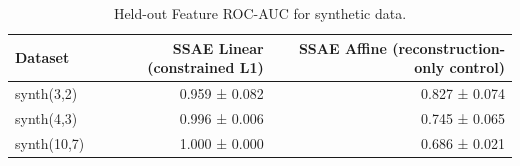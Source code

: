 \begin{table}[t]
\centering
\caption{Held-out Feature ROC-AUC for synthetic data.}
\label{tab:synthetic-sae-auc}
\begin{tabular}{lrr}
\toprule
Dataset & SSAE Linear (constrained L1) & SSAE Affine (reconstruction-only control) \\
\midrule
synth(3,2) & 0.959 ± 0.082 & 0.827 ± 0.074 \\
synth(4,3) & 0.996 ± 0.006 & 0.745 ± 0.065 \\
synth(10,7) & 1.000 ± 0.000 & 0.686 ± 0.021 \\
\bottomrule
\end{tabular}
\end{table}

